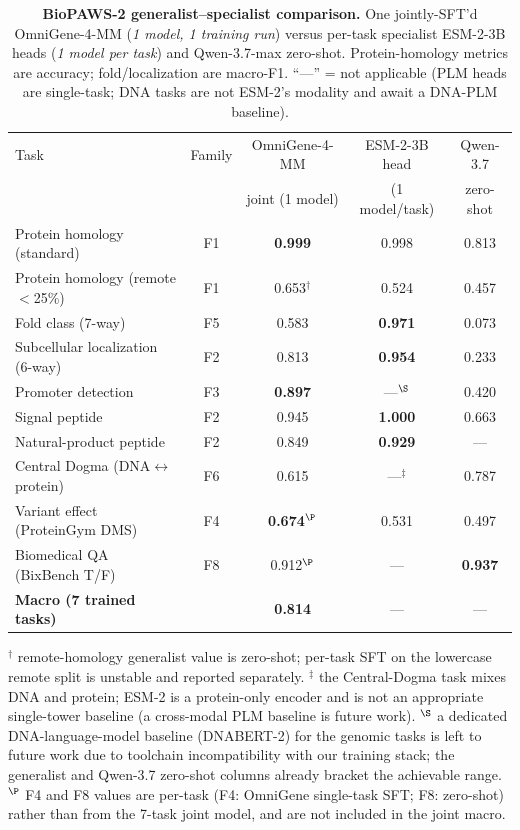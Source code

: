 \begin{table}[t]
\centering
\small
\caption{\textbf{BioPAWS-2 generalist--specialist comparison.} One jointly-SFT'd
OmniGene-4-MM (\emph{1 model, 1 training run}) versus per-task specialist ESM-2-3B heads
(\emph{1 model per task}) and Qwen-3.7-max zero-shot. Protein-homology metrics are
accuracy; fold/localization are macro-F1. ``---'' = not applicable (PLM heads are
single-task; DNA tasks are not ESM-2's modality and await a DNA-PLM baseline).}
\label{tab:biopaws2_main}
\begin{tabular}{lcccc}
\toprule
Task & Family & OmniGene-4-MM & ESM-2-3B head & Qwen-3.7 \\
     &        & joint (1 model) & (1 model/task) & zero-shot \\
\midrule
Protein homology (standard)      & F1 & \textbf{0.999} & 0.998 & 0.813 \\
Protein homology (remote $<$25\%)& F1 & 0.653$^{\dagger}$ & 0.524 & 0.457 \\
Fold class (7-way)               & F5 & 0.583 & \textbf{0.971} & 0.073 \\
Subcellular localization (6-way) & F2 & 0.813 & \textbf{0.954} & 0.233 \\
Promoter detection               & F3 & \textbf{0.897} & ---$^{\S}$ & 0.420 \\
Signal peptide                   & F2 & 0.945 & \textbf{1.000} & 0.663 \\
Natural-product peptide          & F2 & 0.849 & \textbf{0.929} & --- \\
Central Dogma (DNA$\leftrightarrow$protein) & F6 & 0.615 & ---$^{\ddagger}$ & 0.787 \\
Variant effect (ProteinGym DMS)  & F4 & \textbf{0.674}$^{\P}$ & 0.531 & 0.497 \\
Biomedical QA (BixBench T/F)     & F8 & 0.912$^{\P}$ & --- & \textbf{0.937} \\
\midrule
\textbf{Macro (7 trained tasks)} & & \textbf{0.814} & --- & --- \\
\bottomrule
\end{tabular}

\vspace{2pt}
{\footnotesize $^{\dagger}$ remote-homology generalist value is zero-shot; per-task SFT on
the lowercase remote split is unstable and reported separately.
$^{\ddagger}$ the Central-Dogma task mixes DNA and protein; ESM-2 is a protein-only encoder
and is not an appropriate single-tower baseline (a cross-modal PLM baseline is future work).
$^{\S}$ a dedicated DNA-language-model baseline (DNABERT-2) for the genomic tasks is left to
future work due to toolchain incompatibility with our training stack; the generalist and
Qwen-3.7 zero-shot columns already bracket the achievable range.
$^{\P}$ F4 and F8 values are per-task (F4: OmniGene single-task SFT; F8: zero-shot) rather
than from the 7-task joint model, and are not included in the joint macro.}
\end{table}

